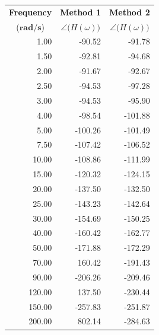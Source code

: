 \documentclass{article}
\begin{document}
\begin{table}[H]
\begin{minipage}{7cm}
\begin{tabular}{rrr}
			\toprule
			\multicolumn{1}{c}{\textbf{Frequency}} & 
			\multicolumn{1}{c}{\textbf{Method 1}} & \multicolumn{1}{c}{\textbf{Method 2}}\\
			\multicolumn{1}{c}{($\mathbf{\si{\radian\per\second}}$)} & 
			\multicolumn{1}{c}{$\angle\big(H(\omega)\big)$} & \multicolumn{1}{c}{$\angle\big(H(\omega)\big)$}\\
			\midrule
			1.00	&	-90.52		&	-91.78\\
			1.50	&	-92.81		&	-94.68\\
			2.00	&	-91.67		&	-92.67\\
			2.50	&	-94.53		&	-97.28\\
			3.00	&	-94.53		&	-95.90\\
			4.00	&	-98.54		&	-101.88\\
			5.00	&	-100.26		&	-101.49\\
			7.50	&	-107.42		&	-106.52\\
			10.00	&	-108.86		&	-111.99\\
			15.00	&	-120.32		&	-124.15\\
			20.00	&	-137.50		&	-132.50\\
			25.00	&	-143.23		&	-142.64\\
			30.00	&	-154.69		&	-150.25\\
			40.00	&	-160.42		&	-162.77\\
			50.00	&	-171.88		&	-172.29\\
			70.00	&	160.42		&	-191.43\\
			90.00	&	-206.26		&	-209.46\\
			120.00	&	137.50		&	-230.44\\
			150.00	&	-257.83		&	-251.87\\
			200.00	&	802.14		&	-284.63\\
			\bottomrule
		\end{tabular}
	\end{minipage}
\end{table}
\end{document}
